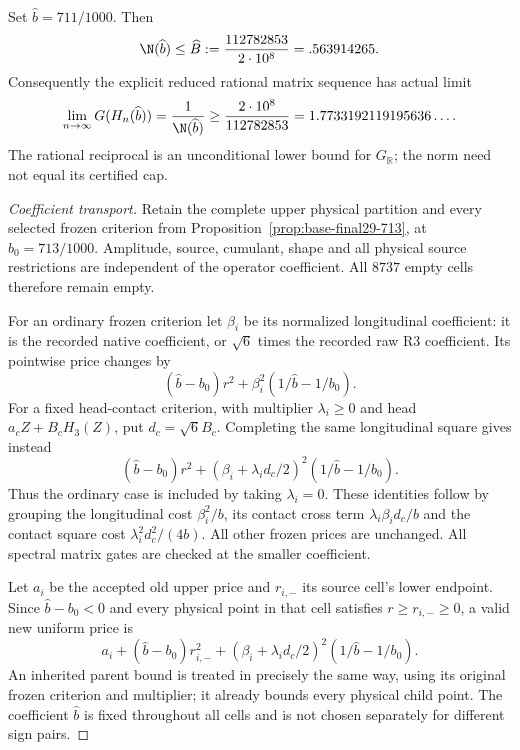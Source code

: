 \begin{theorem}
\label{thm:final-preferred-polygon}
Set $\widehat b=711/1000$. Then
\[
 \N(\widehat b)\le\widehat B:=\frac{112782853}{2\cdot10^8}
 =.563914265.
\]
Consequently the explicit reduced rational matrix sequence has actual limit
\[
 \lim_{n\to\infty}G(H_n(\widehat b))
 =\frac1{\N(\widehat b)}
 \ge\frac{2\cdot10^8}{112782853}
 =1.7733192119195636\ldots .
\]
The rational reciprocal is an unconditional lower bound for
$G_{\mathbb R}$; the norm need not equal its certified cap.
\end{theorem}
\begin{proof}[Coefficient transport]
Retain the complete upper physical partition and every selected frozen
criterion from Proposition~\ref{prop:base-final29-713}, at
$b_0=713/1000$. Amplitude, source, cumulant, shape and all physical
source restrictions are independent of the operator coefficient.
All $8737$ empty cells therefore remain empty.

For an ordinary frozen criterion let $\beta_i$ be its normalized
longitudinal coefficient: it is the recorded native coefficient, or
$\sqrt6$ times the recorded raw R3 coefficient. Its pointwise price
changes by
\[
 (\widehat b-b_0)r^2+
 \beta_i^2(1/\widehat b-1/b_0).
\]
For a fixed head-contact criterion, with multiplier $\lambda_i\ge0$
and head $a_cZ+B_cH_3(Z)$, put $d_c=\sqrt6B_c$. Completing the same
longitudinal square gives instead
\[
 (\widehat b-b_0)r^2+
 (\beta_i+\lambda_i d_c/2)^2
       (1/\widehat b-1/b_0).
\]
Thus the ordinary case is included by taking $\lambda_i=0$.
These identities follow by grouping the longitudinal cost
$\beta_i^2/b$, its contact cross term
$\lambda_i\beta_i d_c/b$ and the contact square cost
$\lambda_i^2d_c^2/(4b)$. All other frozen prices are unchanged.
All spectral matrix gates are checked at the smaller coefficient.

Let $a_i$ be the accepted old upper price and $r_{i,-}$ its source
cell's lower endpoint. Since $\widehat b-b_0<0$ and every physical
point in that cell satisfies $r\ge r_{i,-}\ge0$, a valid new uniform
price is
\[
 a_i+(\widehat b-b_0)r_{i,-}^2+
 (\beta_i+\lambda_i d_c/2)^2(1/\widehat b-1/b_0).
\]
An inherited parent bound is treated in precisely the same way, using
its original frozen criterion and multiplier; it already bounds every
physical child point. The coefficient $\widehat b$ is fixed throughout
all cells and is not chosen separately for different sign pairs.


\end{proof}
